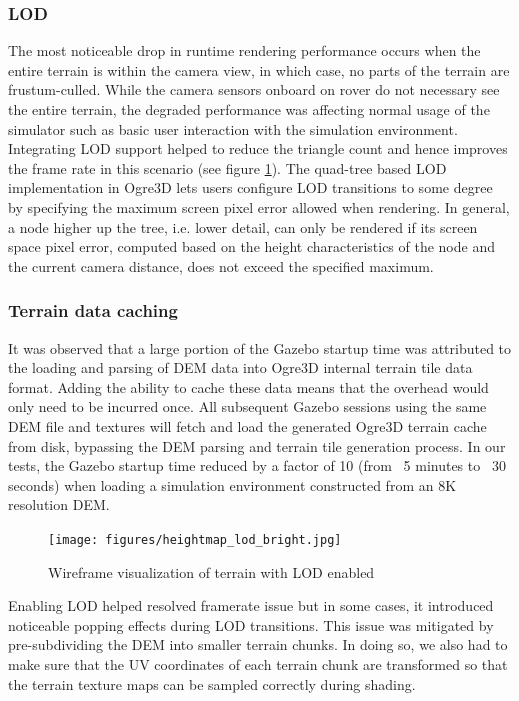 \documentclass[twocolumn,letterpaper]{IEEEAerospaceCLS}  %
\begin{document}
\subsubsection{LOD}

The most noticeable drop in runtime rendering performance occurs when the entire terrain is within the camera view, in which case, no parts of the terrain are frustum-culled. 
While the camera sensors onboard on rover do not necessary see the entire terrain, the degraded performance was affecting normal usage of the simulator such as basic user interaction with the simulation environment. 
Integrating LOD support helped to reduce the triangle count and hence improves the frame rate in this scenario (see figure \ref{fig:heightmaplod}). 
The quad-tree based LOD implementation in Ogre3D lets users configure LOD transitions to some degree by specifying the maximum screen pixel error allowed when rendering. 
In general, a node higher up the tree, i.e. lower detail, can only be rendered if its screen space pixel error, computed based on the height characteristics of the node and the current camera distance, does not exceed the specified maximum. 

\subsubsection{Terrain data caching}

It was observed that a large portion of the Gazebo startup time was attributed to the loading and parsing of DEM data into Ogre3D internal terrain tile data format. 
Adding the ability to cache these data means that the overhead would only need to be incurred once. 
All subsequent Gazebo sessions using the same DEM file and textures will fetch and load the generated Ogre3D terrain cache from disk, bypassing the DEM parsing and terrain tile generation process. 
In our tests, the Gazebo startup time reduced by a factor of 10 (from ~5 minutes to ~30 seconds) when loading a simulation environment constructed from an 8K resolution DEM.

\begin{figure}[h!]
	\texttt{[image: figures/heightmap\_lod\_bright.jpg]}
   	\caption{Wireframe visualization of terrain with LOD enabled}
    \label{fig:heightmaplod}
\end{figure}

Enabling LOD helped resolved framerate issue but in some cases, it introduced noticeable popping effects during LOD transitions. 
This issue was mitigated by pre-subdividing the DEM into smaller terrain chunks. 
In doing so, we also had to make sure that the UV coordinates of each terrain chunk are transformed so that the terrain texture maps can be sampled correctly during shading.
\end{document}

